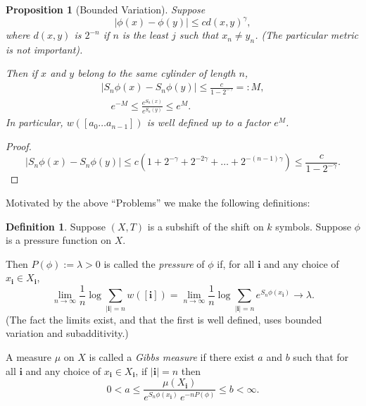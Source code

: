 \documentclass[a4paper]{amsart}
\theoremstyle{plain}
\newtheorem{proposition}[theorem]{Proposition}
\theoremstyle{definition}
\newtheorem{definition}[theorem]{Definition}%
\theoremstyle{remark}
\begin{document}
\begin{proposition}[Bounded Variation] \label{prpbv} Suppose
\[
|\phi(x) - \phi(y) | \leq c d(x,y)^\gamma,
\]
where $ d(x,y) $ is $ 2^{-n} $  if $ n$ is the least $ j $ such that $ x_n\neq y_n $. (The particular metric is not important). 

Then if $ x $ and $ y $ belong to the same cylinder of length $ n $, 
\begin{gather*}   |S_n\phi(x) -S_n\phi(y)| \leq \frac{c}{1-2^{-\gamma }} =: M,\\
\quad e^{-M} \leq \frac{e^{S_n(x)}}{e^{S_n(y)}} \leq e^M.
\end{gather*}
In particular,  $ w([a_0\dots a_{n-1}]) $ is well defined up to a factor $ e^M $.
\end{proposition} 

\begin{proof} 
\[
\big|S_n\phi(x) -S_n\phi(y)\big| \leq c \left( 1 + 2^{-\gamma}+ 2^{-2\gamma}+ \dots +2^{-(n-1)\gamma}\right)
 \leq \frac{c}{1- 2^{-\gamma}} .
 \] \qedhere
 \end{proof}  





Motivated by the above ``Problems'' we make the following definitions:
\begin{definition} \label{dfpg} Suppose $ (X,T) $ is a subshift of the shift on $ k $ symbols.  Suppose $ \phi $ is a pressure function on $ X $.

Then $ P(\phi) :=\lambda >0 $ is called the \emph{pressure} of $ \phi $ if, for all $ \boldsymbol{i} $ and any choice of $ x_{ \boldsymbol{i} }\in X_{\boldsymbol{i} } $,
\begin{equation} \label{dfpr} 
\lim_{n\to \infty} \frac{1}{n}\log \sum_{|\boldsymbol{i}|=n} w([\boldsymbol{i}])  =
\lim_{n\to \infty} \frac{1}{n}\log \sum_{|\boldsymbol{i}|=n} e^{ S_n\phi(x_{ \boldsymbol{i} })}   \to \lambda .
\end{equation} 
(The fact the limits exist, and that the first is well defined, uses bounded variation and subadditivity.)  

A   measure $ \mu $ on $ X $ is called a \emph{Gibbs measure} if  there exist  $ a$ and $ b $ such that for all $ \boldsymbol{i} $ and any choice of $ x_{ \boldsymbol{i} }\in X_{\boldsymbol{i} } $, if  $ | \boldsymbol{i} | = n $ then
\begin{equation} \label{dfgm}  
 0<a \leq \frac{ \mu (X_{\boldsymbol{i}})} { e^{S_n\phi(x_{ \boldsymbol{i} }) }\, e^{-nP(\phi)}} \leq b <\infty.
\end{equation} 
\end{definition} 
\end{document}
